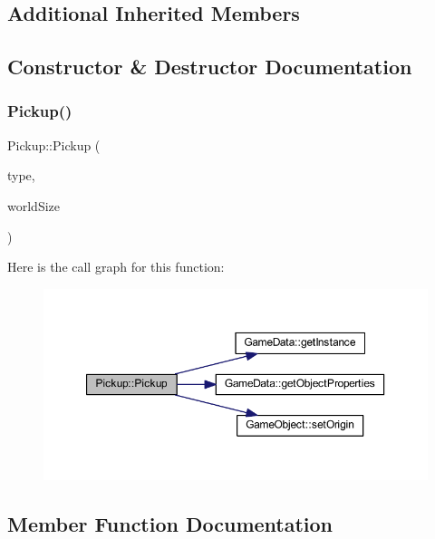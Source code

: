 \subsection*{Additional Inherited Members}


\subsection{Constructor \& Destructor Documentation}
\mbox{\label{class_pickup_ab3ad1a30e2b84f25d66c397403128e0e}} 
\subsubsection{\texorpdfstring{Pickup()}{Pickup()}}
{\footnotesize\ttfamily Pickup\+::\+Pickup (\begin{DoxyParamCaption}\item[{\hyperlink{class_game_object_a4bf9e8f660e6a49f1b802c2aa9dd95af}{Game\+Object\+::\+Type}}]{type,  }\item[{const sf\+::\+Vector2f \&}]{world\+Size }\end{DoxyParamCaption})}

Here is the call graph for this function\+:
\nopagebreak
\begin{figure}[H]
\begin{center}
\leavevmode
\includegraphics[width=350pt]{class_pickup_ab3ad1a30e2b84f25d66c397403128e0e_cgraph}
\end{center}
\end{figure}


\subsection{Member Function Documentation}
\mbox{\label{class_pickup_a009910dfc9488746b3944cfcdd5be7e9}} 
